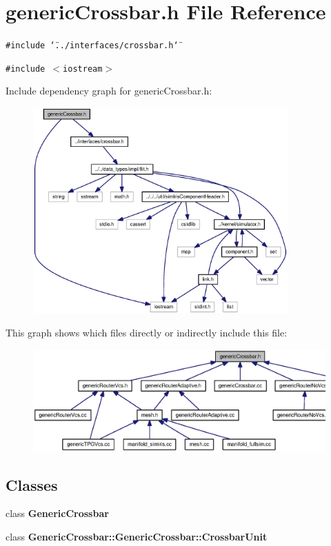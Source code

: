 \section{genericCrossbar.h File Reference}
\label{genericCrossbar_8h}
{\tt \#include \char`\"{}../interfaces/crossbar.h\char`\"{}}\par
{\tt \#include $<$iostream$>$}\par


Include dependency graph for genericCrossbar.h:\nopagebreak
\begin{figure}[H]
\begin{center}
\leavevmode
\includegraphics[width=277pt]{genericCrossbar_8h__incl}
\end{center}
\end{figure}


This graph shows which files directly or indirectly include this file:\nopagebreak
\begin{figure}[H]
\begin{center}
\leavevmode
\includegraphics[width=369pt]{genericCrossbar_8h__dep__incl}
\end{center}
\end{figure}
\subsection*{Classes}
\begin{CompactItemize}
\item 
class {\bf GenericCrossbar}
\item 
class {\bf GenericCrossbar::GenericCrossbar::CrossbarUnit}
\end{CompactItemize}
